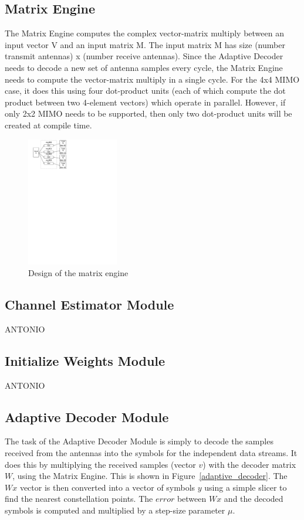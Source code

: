 \documentclass[journal]{IEEEtran}
\begin{document}
\subsection{Matrix Engine}

The Matrix Engine computes the complex vector-matrix multiply between an input vector V and an input matrix M. The input matrix M has size (number transmit antennas) x (number receive antennas). Since the Adaptive Decoder needs to decode a new set of antenna samples every cycle, the Matrix Engine needs to compute the vector-matrix multiply in a single cycle. For the 4x4 MIMO case, it does this using four dot-product units (each of which compute the dot product between two 4-element vectors) which operate in parallel. However, if only 2x2 MIMO needs to be supported, then only two dot-product units will be created at compile time.

\begin{figure}[!h]
\centering
\includegraphics*[width=4cm, viewport = 30 640 260 840]{images/matrix_engine.pdf}
\caption{Design of the matrix engine}
\label{matrix_engine}
\end{figure}

\subsection{Channel Estimator Module}

ANTONIO

\subsection{Initialize Weights Module}

ANTONIO

\subsection{Adaptive Decoder Module}

The task of the Adaptive Decoder Module is simply to decode the samples received from the antennas into the symbols for the independent data streams. It does this by multiplying the received samples (vector $v$) with the decoder matrix $W$, using the Matrix Engine. This is shown in Figure~\ref{adaptive_decoder}. The $Wx$ vector is then converted into a vector of symbols $y$ using a simple slicer to find the nearest constellation points. The $error$ between $Wx$ and the decoded symbols is computed and multiplied by a step-size parameter $\mu$.
\end{document}
